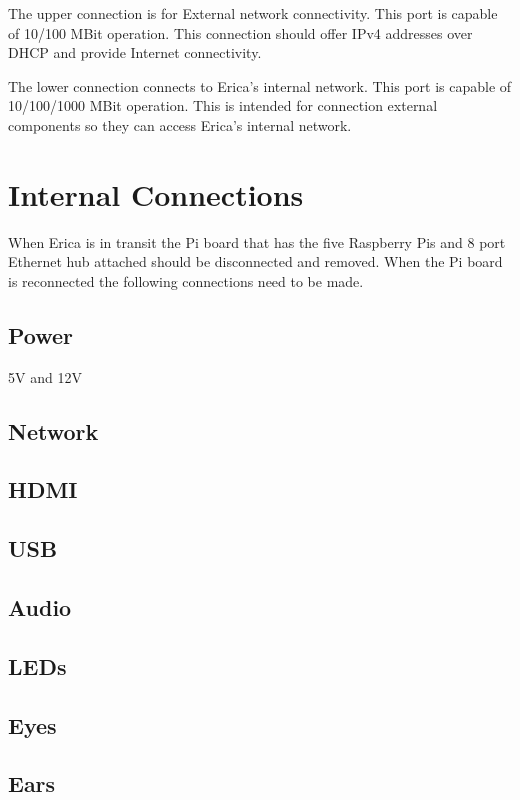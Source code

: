 The upper connection is for External network connectivity.  This port is capable of 10/100 MBit operation. This connection should offer IPv4 addresses over DHCP and provide Internet connectivity.

The lower connection connects to Erica's internal network.  This port is capable of 10/100/1000 MBit operation.  This is intended for connection external components so they can access Erica's internal network.


\section{Internal Connections}
When Erica is in transit the Pi board that has the five Raspberry Pis and 8 port Ethernet hub attached should be disconnected and removed.  When the Pi board is reconnected the following connections need to be made.

\subsection{Power}
5V and 12V

\subsection{Network}

\subsection{HDMI}

\subsection{USB}

\subsection{Audio}

\subsection{LEDs}

\subsection{Eyes}

\subsection{Ears}
